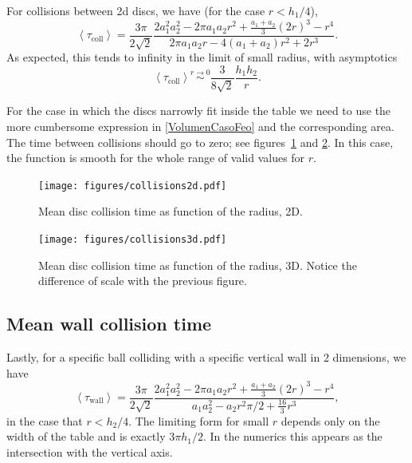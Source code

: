 \documentclass[superscriptaddress,pre,reprint,showpacs,twocolumn]{revtex4-1}
\newcommand{\mean}[1]{\left \langle #1 \right \rangle}
\begin{document}
For collisions between 2d discs, we have (for the case $r < h_1/4$),
\begin{equation}\label{colltau}
 \mean{\tau_\text{coll}} = 	
\frac{3 \pi}{2\sqrt{2}}
\frac {2 a_1^2 a_2^2  - 2 \pi a_1 a_2 r^{2} + \textstyle \frac{a_1+a_2}{3}  (2r)^{3}
  -  r^4}
{2\pi a_1 a_2 r -4(a_1+a_2)r^2+2r^3}.
\end{equation}
As expected, this tends to infinity in the limit of small radius, with asymptotics
\begin{equation}\label{colltaulim0}
\mean{\tau_\text{coll}} \overset{r \to 0}{\sim}
\frac{3}{8\sqrt{2}}\frac{h_1h_2}{r}.
\end{equation}

For the case in which the discs narrowly fit inside the table we need to
use the more cumbersome expression in \eqref{VolumenCasoFeo} and
the corresponding area. The time between collisions should go to zero; 
see figures~\ref{meancol2d}  and \ref{meancol3d}.
In this case, the function is smooth for the whole
range of valid values for $r$.

\begin{figure}[h]
  \centering
  \texttt{[image: figures/collisions2d.pdf]}
  \caption{Mean disc collision time as function of the radius, 2D. }\label{meancol2d}
\end{figure}


\begin{figure}[h]
  \centering
  \texttt{[image: figures/collisions3d.pdf]}
  \caption{Mean disc collision time as function of the radius, 3D.
  Notice the difference of scale with the previous figure.}\label{meancol3d}
\end{figure}


\subsection{Mean wall collision time}

Lastly, for a specific ball colliding with a specific vertical wall
in 2 dimensions, we have
\begin{equation}\label{impactwall}
 \mean{\tau_\text{wall}} = 	
\frac{3 \pi}{2\sqrt{2}}
\frac { 2a_1^2 a_2^2  -  2\pi a_1 a_2 r^2 + \frac{a_1+a_2}{3}(2r)^3 - r^4}
{a_1a_2^2-a_2 r^2\pi/2 + \frac{16}{3} r^3 },
\end{equation}
in the case that $r<h_2/4$. The limiting form for small $r$ depends
only on the width of the table and is exactly
$3\pi h_1/2$. In the numerics this appears as the intersection with the vertical
axis.
\end{document}
